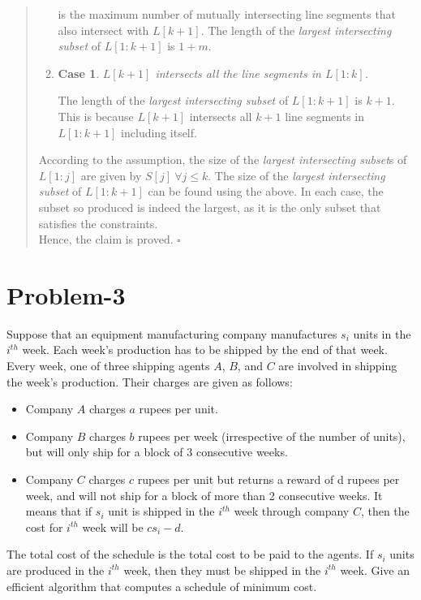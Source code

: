 \documentclass[12pt]{report}
\newtheorem{case}{Case}
\begin{document}
\begin{quote}
\begin{enumerate}
{            } is the maximum number of mutually intersecting line segments that also intersect with $L[k+1]$.
            The length of the \textit{largest intersecting subset} of $L[1:k+1]$ is $1 + m$.
            \item
            \begin{case}
                $L[k+1]$ intersects all the line segments in $L[1:k]$.
            \end{case}
            The length of the \textit{largest intersecting subset} of $L[1:k+1]$ is $k+1$.
            This is because $L[k+1]$ intersects all $k+1$ line segments in $L[1:k+1]$ including itself.
        \end{enumerate}
        According to the assumption, the size of the \textit{largest intersecting subset}s of $L[1:j]$ are given by $S[j] \ \forall j \le k$.
        The size of the \textit{largest intersecting subset} of $L[1:k+1]$ can be found using the above.
        In each case, the subset so produced is indeed the largest, as it is the only subset that satisfies the constraints.
        \vspace*{7.5pt} \\
        Hence, the claim is proved. \hfill $\square$
    \end{quote}
    \vfill
    \pagebreak

    \section*{\huge{Problem-3}}
    Suppose that an equipment manufacturing company manufactures $s_{i}$ units in the $i^{th}$ week.
    Each week's production has to be shipped by the end of that week.
    Every week, one of three shipping agents $A$, $B$, and $C$ are involved in shipping the week's production.
    Their charges are given as follows:
    \begin{itemize}
        \item
        Company $A$ charges $a$ rupees per unit.
        \item
        Company $B$ charges $b$ rupees per week (irrespective of the number of units), but will only ship for a block of 3 consecutive weeks.
        \item
        Company $C$ charges $c$ rupees per unit but returns a reward of d rupees per week, and will not ship for a block of more than 2 consecutive weeks.
        It means that if $s_{i}$ unit is shipped in the $i^{th}$ week through company $C$, then the cost for $i^{th}$ week will be $cs_{i} - d$.
    \end{itemize}
    The total cost of the schedule is the total cost to be paid to the agents. If $s_{i}$ units are produced in the $i^{th}$ week, then they must be shipped
    in the $i^{th}$ week.
    Give an efficient algorithm that computes a schedule of minimum cost.
\end{document}
